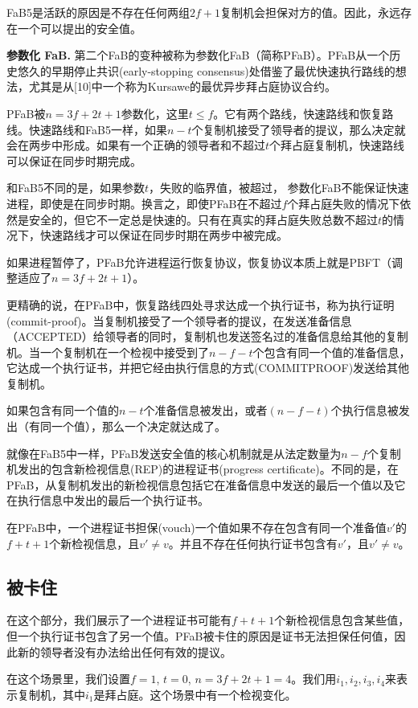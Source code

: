 \documentclass[UTF8]{ctexart}
\begin{document}
FaB5是活跃的原因是不存在任何两组$2f + 1$复制机会担保对方的值。因此，永远存在一个可以提出的安全值。

\textbf{参数化 FaB.} \hspace{3mm} 第二个FaB的变种被称为参数化FaB（简称PFaB）。PFaB从一个历史悠久的早期停止共识(early-stopping consensus)处借鉴了最优快速执行路线的想法，尤其是从[10]中一个称为Kursawe的最优异步拜占庭协议合约。

PFaB被$n = 3f + 2t + 1$参数化，这里$t \le f$。它有两个路线，快速路线和恢复路线。快速路线和FaB5一样，如果$n - t$个复制机接受了领导者的提议，那么决定就会在两步中形成。如果有一个正确的领导者和不超过$t$个拜占庭复制机，快速路线可以保证在同步时期完成。

和FaB5不同的是，如果参数$t$，失败的临界值，被超过， 参数化FaB不能保证快速进程，即使是在同步时期。换言之，即使PFaB在不超过$f$个拜占庭失败的情况下依然是安全的，但它不一定总是快速的。只有在真实的拜占庭失败总数不超过$t$的情况下，快速路线才可以保证在同步时期在两步中被完成。

如果进程暂停了，PFaB允许进程运行恢复协议，恢复协议本质上就是PBFT（调整适应了$n = 3f + 2t +1$）。

更精确的说，在PFaB中，恢复路线四处寻求达成一个执行证书，称为执行证明(commit-proof)。当复制机接受了一个领导者的提议，在发送准备信息（ACCEPTED）给领导者的同时，复制机也发送签名过的准备信息给其他的复制机。当一个复制机在一个检视中接受到了$n - f - t$个包含有同一个值的准备信息，它达成一个执行证书，并把它经由执行信息的方式(COMMITPROOF)发送给其他复制机。

如果包含有同一个值的$n - t$个准备信息被发出，或者$(n - f - t)$个执行信息被发出（有同一个值），那么一个决定就达成了。

就像在FaB5中一样，PFaB发送安全值的核心机制就是从法定数量为$n - f$个复制机发出的包含新检视信息(REP)的进程证书(progress certificate)。不同的是，在PFaB，从复制机发出的新检视信息包括它在准备信息中发送的最后一个值以及它在执行信息中发出的最后一个执行证书。

在PFaB中，一个进程证书担保(vouch)一个值如果不存在包含有同一个准备值$v'$的$f + t + 1$个新检视信息，且$v' \neq v$。并且不存在任何执行证书包含有$v'$，且$v' \neq v$。
\subsection{被卡住}
在这个部分，我们展示了一个进程证书可能有$f + t + 1$个新检视信息包含某些值，但一个执行证书包含了另一个值。PFaB被卡住的原因是证书无法担保任何值，因此新的领导者没有办法给出任何有效的提议。

在这个场景里，我们设置$f = 1$, $t = 0$, $n = 3f + 2t + 1 = 4$。我们用$i_1, i_2, i_3, i_4$来表示复制机，其中$i_1$是拜占庭。这个场景中有一个检视变化。
\end{document}
